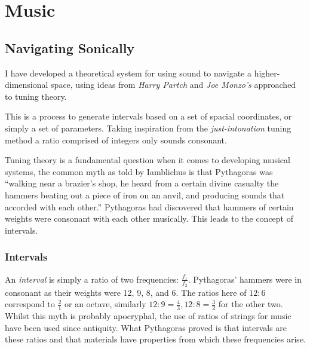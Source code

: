 \chapter{Music}
\section{Navigating Sonically}
\label{sonicnav}
I have developed a theoretical system for using sound to navigate a
higher-dimensional space, using ideas from \emph{Harry Partch} and \emph{Joe
Monzo's} approached to tuning theory.

This is a process to generate intervals based on a set of spacial coordinates,
or simply a set of parameters. Taking inspiration from the
\emph{just-intonation} tuning method a ratio comprised of integers only sounds
consonant.

Tuning theory is a fundamental question when it comes to developing musical
systems, the common myth as told by Iamblichus is that Pythagoras was ``walking
near a brazier's shop, he heard from a certain divine casualty the hammers
beating out a piece of iron on an anvil, and producing sounds that accorded with
each other.'' \citep[p.62]{iamblichus} Pythagoras had discovered that hammers of
certain weights were consonant with each other musically. This leads to the
concept of intervals.

\subsection{Intervals}
An \emph{interval} is simply a ratio of two frequencies: $\frac{f_1}{f_2}$.
Pythagoras' hammers were in consonant as their weights were 12, 9, 8, and 6.
The ratios here of $12:6$ correspond to $\frac{2}{1}$ or an octave, similarly
$12:9 = \frac{4}{3}, 12:8 = \frac{3}{2}$ for the other two. Whilst this myth is
probably apocryphal, the use of ratios of strings for music have been used since
antiquity. What Pythagoras proved is that intervals are these ratios and that
materials have properties from which these frequencies arise.

